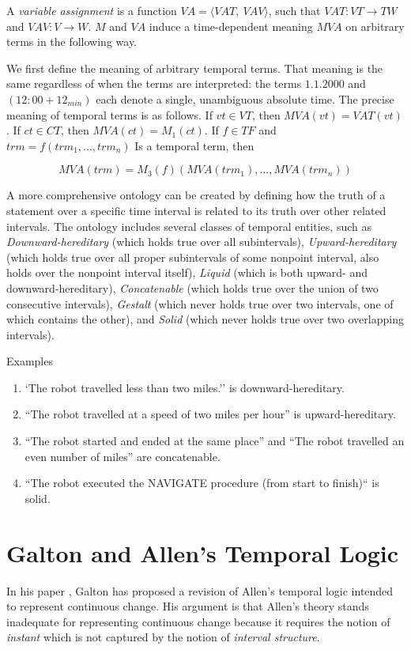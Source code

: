 A \textit{variable assignment} is a function $ VA = \langle VAT,\ VAV \rangle$, such that $VAT: VT \to TW$ and
$VAV: V \to W$. $M$ and $VA$ induce a time-dependent meaning $MVA$ on arbitrary terms in the following way.

We first define the meaning of arbitrary temporal terms. That meaning is the same regardless of when the terms are interpreted: the terms $1.1.2000$ and
$(12:00 + 12_{min})$ each denote a single, unambiguous absolute time. The precise
meaning of temporal terms is as follows. If $vt \in VT $, then $MVA (vt) = VAT (vt)$.
If $ct \in CT$, then $MVA (ct) = M_1(ct)$. If $f \in T F$ and $trm = f(trm_1, . . . , trm_n)$ Is a
temporal term, then

\[
	MVA(trm) = M_3(f)(MVA(trm_1), \dots, MVA(trm_n))
\]

A more comprehensive ontology can be created by defining how the truth of a statement over a specific time interval is related to its truth over other related intervals.
The ontology includes several classes of temporal entities, such as \textit{Downward-hereditary} (which holds true over all subintervals), \textit{Upward-hereditary} (which holds true over all proper subintervals of some nonpoint interval, also holds over the nonpoint interval itself),
\textit{Liquid} (which is both upward- and downward-hereditary), \textit{Concatenable} (which holds true over the union of two consecutive intervals),
\textit{Gestalt} (which never holds true over two intervals, one of which contains the other), and \textit{Solid} (which never holds true over two overlapping intervals).

\begin{exmp} Examples
	\begin{enumerate}
		\item `The robot travelled less than two miles.'' is downward-hereditary.
		\item ``The robot travelled at a speed of two miles per hour'' is upward-hereditary.
		\item ``The robot started and ended at the same place'' and ``The robot travelled an even number of miles'' are concatenable.
		\item ``The robot executed the NAVIGATE procedure (from start to finish)`` is solid.
	\end{enumerate}
\end{exmp}


\section{Galton and Allen's Temporal Logic}
In his paper \cite{galton2004}, Galton has proposed a revision of Allen's temporal logic intended to represent continuous change.
His argument is that Allen's theory stands inadequate for representing continuous change because it requires the notion of \textit{instant} which is not captured by the notion of \textit{interval structure}.

